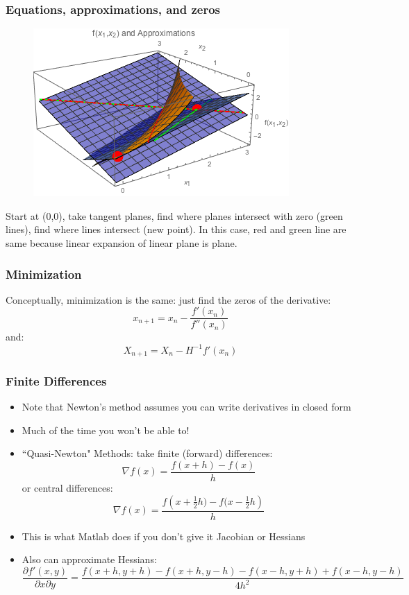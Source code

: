 \documentclass{beamer}
\begin{document}
\begin{frame}
\frametitle[alignment=center]{Equations, approximations, and  zeros}
\begin{figure}[htdb!]
\centering
\includegraphics[scale=0.7]{NewtonsMethod_2d_5.png}
\end{figure}
Start at (0,0), take tangent planes, find where planes intersect with zero (green lines), find where lines intersect (new point).  In this case, red and green line are same because linear expansion of linear plane is plane.
\end{frame}

\begin{frame}
\frametitle[alignment=center]{Minimization}
Conceptually, minimization is the same: just find the zeros of the derivative:
$$x_{n+1}=x_n-\frac{f'(x_n)}{f''(x_n)}$$
and:
$$X_{n+1}=X_n-H^{-1}f'(x_n)$$
\end{frame}

\begin{frame}
\frametitle[alignment=center]{Finite Differences}
\begin{itemize}
\item Note that Newton's method assumes you can write derivatives in closed form
\bigskip
\item Much of the time you won't be able to!
\bigskip
\item ``Quasi-Newton" Methods: take finite (forward) differences:
$$\nabla f(x)=\frac{f(x+h)-f(x)}{h}$$
or central differences:
$$\nabla f(x)=\frac{f\left(x+\frac{1}{2}h)-f(x-\frac{1}{2}h\right)}{h}$$
\item This is what Matlab does if you don't give it Jacobian or Hessians
\item Also can approximate Hessians:
\tiny
$$\frac{\partial f'(x,y)}{\partial x\partial y}=\frac{f(x+h,y+h)-f(x+h,y-h)-f(x-h,y+h)+f(x-h,y-h)}{4h^2}$$
\end{itemize}
\end{frame}
\end{document}
